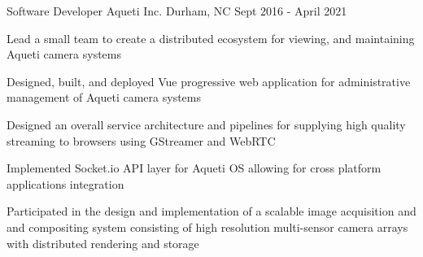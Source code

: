 \begin{cventries}
  \cventry
    {Software Developer} %
    {Aqueti Inc.} %
    {Durham, NC} %
    {Sept 2016 - April 2021} %
    {
      \begin{cvitems} %
        \item {Lead a small team to create a distributed ecosystem for viewing, and maintaining Aqueti camera systems}
        \item {Designed, built, and deployed Vue progressive web application for administrative management of Aqueti camera systems}
        \item {Designed an overall service architecture and pipelines for supplying high quality streaming to browsers using GStreamer and WebRTC}
        \item {Implemented Socket.io API layer for Aqueti OS allowing for cross platform applications integration}
        \item {Participated in the design and implementation of a scalable image acquisition and and compositing system consisting of high resolution multi-sensor camera arrays with distributed rendering and storage}
      \end{cvitems}
    }

\end{cventries}
